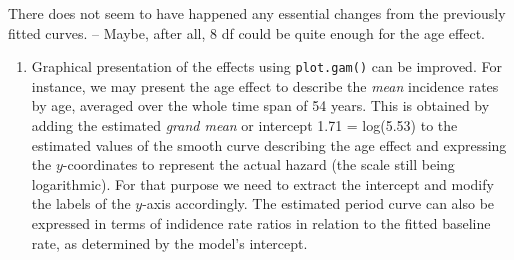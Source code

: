 \documentclass[
]{book}
\providecommand{\tightlist}{%
  \setlength{\itemsep}{0pt}\setlength{\parskip}{0pt}}
\begin{document}
There does not seem to have happened any essential changes from the
previously fitted curves. -- Maybe, after all,
8 df could be quite enough for the age effect.

\begin{enumerate}
\def\labelenumi{\arabic{enumi}.}
\setcounter{enumi}{4}
\tightlist
\item
  Graphical presentation of the effects using \texttt{plot.gam()} can be
  improved. For instance, we may present the age effect to describe
  the \emph{mean} incidence rates by age, averaged over the whole time span
  of 54 years. This is obtained by adding the estimated \emph{grand mean}
  or intercept 1.71 = log(5.53) to the estimated values of the smooth
  curve describing the age effect and expressing the \(y\)-coordinates
  to represent the actual hazard (the scale still being logarithmic).
  For that purpose we need to extract the
  intercept and modify the labels of the \(y\)-axis accordingly. The
  estimated period curve can also be expressed in terms of
  indidence rate ratios in relation to the fitted baseline rate, as
  determined by the model's intercept.
\end{enumerate}
\end{document}
